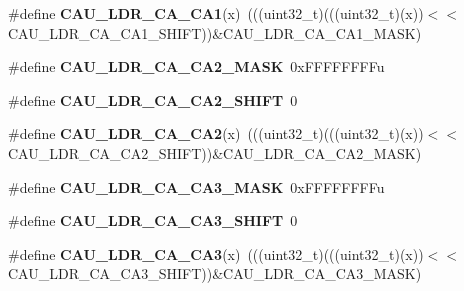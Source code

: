 \begin{DoxyCompactItemize}
\item 
\#define {\bfseries C\+A\+U\+\_\+\+L\+D\+R\+\_\+\+C\+A\+\_\+\+C\+A1}(x)~(((uint32\+\_\+t)(((uint32\+\_\+t)(x))$<$$<$C\+A\+U\+\_\+\+L\+D\+R\+\_\+\+C\+A\+\_\+\+C\+A1\+\_\+\+S\+H\+I\+FT))\&C\+A\+U\+\_\+\+L\+D\+R\+\_\+\+C\+A\+\_\+\+C\+A1\+\_\+\+M\+A\+SK)\hypertarget{group__CAU__Register__Masks_ga17d3eb3ab5c88211cb8c4a41d749b346}{}\label{group__CAU__Register__Masks_ga17d3eb3ab5c88211cb8c4a41d749b346}

\item 
\#define {\bfseries C\+A\+U\+\_\+\+L\+D\+R\+\_\+\+C\+A\+\_\+\+C\+A2\+\_\+\+M\+A\+SK}~0x\+F\+F\+F\+F\+F\+F\+F\+Fu\hypertarget{group__CAU__Register__Masks_gada0be8752ff081d41bd530392613175b}{}\label{group__CAU__Register__Masks_gada0be8752ff081d41bd530392613175b}

\item 
\#define {\bfseries C\+A\+U\+\_\+\+L\+D\+R\+\_\+\+C\+A\+\_\+\+C\+A2\+\_\+\+S\+H\+I\+FT}~0\hypertarget{group__CAU__Register__Masks_gaf922a639148e6bfa357029f20b0d1aef}{}\label{group__CAU__Register__Masks_gaf922a639148e6bfa357029f20b0d1aef}

\item 
\#define {\bfseries C\+A\+U\+\_\+\+L\+D\+R\+\_\+\+C\+A\+\_\+\+C\+A2}(x)~(((uint32\+\_\+t)(((uint32\+\_\+t)(x))$<$$<$C\+A\+U\+\_\+\+L\+D\+R\+\_\+\+C\+A\+\_\+\+C\+A2\+\_\+\+S\+H\+I\+FT))\&C\+A\+U\+\_\+\+L\+D\+R\+\_\+\+C\+A\+\_\+\+C\+A2\+\_\+\+M\+A\+SK)\hypertarget{group__CAU__Register__Masks_ga21841b16ab149bb4c2d3d96657e064e1}{}\label{group__CAU__Register__Masks_ga21841b16ab149bb4c2d3d96657e064e1}

\item 
\#define {\bfseries C\+A\+U\+\_\+\+L\+D\+R\+\_\+\+C\+A\+\_\+\+C\+A3\+\_\+\+M\+A\+SK}~0x\+F\+F\+F\+F\+F\+F\+F\+Fu\hypertarget{group__CAU__Register__Masks_gadc483f48a51a7e423bd122f4175d4dd8}{}\label{group__CAU__Register__Masks_gadc483f48a51a7e423bd122f4175d4dd8}

\item 
\#define {\bfseries C\+A\+U\+\_\+\+L\+D\+R\+\_\+\+C\+A\+\_\+\+C\+A3\+\_\+\+S\+H\+I\+FT}~0\hypertarget{group__CAU__Register__Masks_ga31b5ff2083be706bf9f333d80d4992fc}{}\label{group__CAU__Register__Masks_ga31b5ff2083be706bf9f333d80d4992fc}

\item 
\#define {\bfseries C\+A\+U\+\_\+\+L\+D\+R\+\_\+\+C\+A\+\_\+\+C\+A3}(x)~(((uint32\+\_\+t)(((uint32\+\_\+t)(x))$<$$<$C\+A\+U\+\_\+\+L\+D\+R\+\_\+\+C\+A\+\_\+\+C\+A3\+\_\+\+S\+H\+I\+FT))\&C\+A\+U\+\_\+\+L\+D\+R\+\_\+\+C\+A\+\_\+\+C\+A3\+\_\+\+M\+A\+SK)\hypertarget{group__CAU__Register__Masks_ga01e9876211bc7569a7fed8b22019a8aa}{}\label{group__CAU__Register__Masks_ga01e9876211bc7569a7fed8b22019a8aa}


\end{DoxyCompactItemize}
